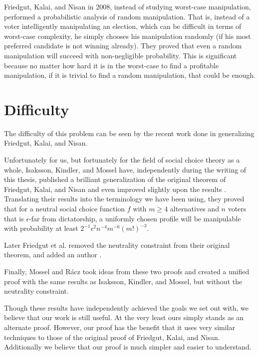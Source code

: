 	Friedgut, Kalai, and Nisan \cite{friedgut2008elections} in 2008, instead of studying worst-case manipulation, performed a probabilistic analysis of random manipulation. That is, instead of a voter intelligently manipulating an election, which can be difficult in terms of worst-case complexity, he simply chooses his manipulation randomly (if his most preferred candidate is not winning already). They proved that even a random manipulation will succeed with non-negligible probability. This is significant because no matter how hard it is in the worst-case to find a profitable manipulation, if it is trivial to find a random manipulation, that could be enough.


\section{Difficulty}

	The difficulty of this problem can be seen by the recent work done in generalizing Friedgut, Kalai, and Nisan.


	Unfortunately for us, but fortunately for the field of social choice theory as a whole, Isaksson, Kindler, and Mossel have, independently during the writing of this thesis, published a brilliant generalization of the original theorem of Friedgut, Kalai, and Nisan and even improved slightly upon the results \cite{isaksson2010geometry}. Translating their results into the terminology we have been using, they proved that for a neutral social choice function $f$ with $m \ge 4$ alternatives and $n$ voters that is $\epsilon$-far from dictatorship, a uniformly chosen profile will be manipulable with probability at least $2^{-1} \epsilon^2 n^{-4} m^{-6} (m!)^{-3}$.

	Later Friedgut et al. removed the neutrality constraint from their original theorem, and added an author \cite{friedgut2011quantitative}.

	Finally, Mossel and R\'{a}cz \cite{mossel2011quantitative} took ideas from these two proofs and created a unified proof with the same results as Isaksson, Kindler, and Mossel, but without the neutrality constraint.

	Though these results have independently achieved the goals we set out with, we believe that our work is still useful. At the very least ours simply stands as an alternate proof. However, our proof has the benefit that it uses very similar techniques to those of the original proof of Friedgut, Kalai, and Nisan. Additionally we believe that our proof is much simpler and easier to understand.



